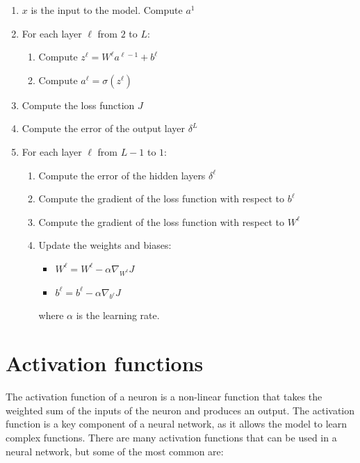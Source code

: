 \begin{enumerate}
    \item $x$ is the input to the model. Compute $a^1$
    \item For each layer $\ell$ from $2$ to $L$:
    \begin{enumerate}
        \item Compute $z^\ell = W^\ell a^{\ell-1} + b^\ell$
        \item Compute $a^\ell = \sigma(z^\ell)$
    \end{enumerate}
    \item Compute the loss function $J$
    \item Compute the error of the output layer $\delta^L$
    \item For each layer $\ell$ from $L-1$ to $1$:
    \begin{enumerate}
        \item Compute the error of the hidden layers $\delta^\ell$
        \item Compute the gradient of the loss function with respect to $b^\ell$
        \item Compute the gradient of the loss function with respect to $W^\ell$
        \item Update the weights and biases:
        \begin{itemize}
            \item $W^\ell = W^\ell - \alpha \nabla_{W^\ell} J$
            \item $b^\ell = b^\ell - \alpha \nabla_{b^\ell} J$
        \end{itemize}

        where $\alpha$ is the learning rate.
    \end{enumerate}
\end{enumerate}

\section{Activation functions}

The activation function of a neuron is a non-linear function that takes the weighted
sum of the inputs of the neuron and produces an output. The activation function is
a key component of a neural network, as it allows the model to learn complex functions.
There are many activation functions that can be used in a neural network, but some
of the most common are:

